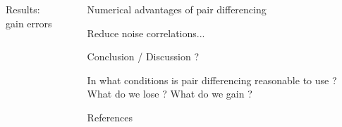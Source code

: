\documentclass[final]{beamer}
\newlength{\sepwidth}
\newlength{\colwidth}
\newcommand{\separatorcolumn}{\begin{column}{\sepwidth}\end{column}}
\begin{document}
\begin{frame}[t]
\begin{columns}[t]
\begin{column}{\colwidth}
\begin{block}{Results: gain errors}
      \end{block}

    \end{column}

    \separatorcolumn

    \begin{column}{\colwidth}

      \begin{exampleblock}{Numerical advantages of pair differencing}

        Reduce noise correlations...

      \end{exampleblock}

      \begin{block}{Conclusion / Discussion ?}

        In what conditions is pair differencing reasonable to use ?
        What do we lose ? What do we gain ?

      \end{block}

      \begin{block}{References}

        \nocite{*}
        \footnotesize{}

      \end{block}

    \end{column}

    \separatorcolumn
  \end{columns}
\end{frame}
\end{document}
